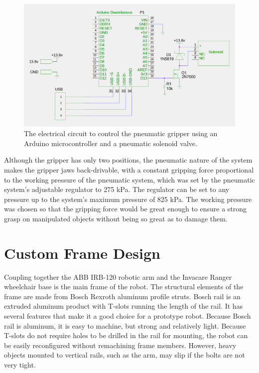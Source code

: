 \documentclass[]{cwru} %
\begin{document}
\begin{figure}[h]
\centering
\includegraphics[width=6.0in]{gripper}
\caption{The electrical circuit to control the pneumatic gripper using 
an Arduino microcontroller and a pneumatic solenoid valve.}
\label{fig:gripper-schematic}
\end{figure}

Although the gripper has only two positions, the pneumatic nature of the
system makes the gripper jaws back-drivable, with a constant gripping
force proportional to the working pressure of the pneumatic system,
which was set by the pneumatic system's adjustable regulator to 275 kPa.
The regulator can be set to any pressure up to the system's maximum
pressure of 825 kPa. The working pressure was chosen so that the
gripping force would be great enough to ensure a strong grasp on
manipulated objects without being so great as to damage
them.

\section{Custom Frame Design}

Coupling together the ABB IRB-120 robotic arm and the Invacare Ranger
wheelchair base is the main frame of the robot. The structural elements
of the frame are made from Bosch Rexroth aluminum profile struts. Bosch
rail is an extruded aluminum product with T-slots running the length of
the rail. It has several features that make it a good choice for a
prototype robot. Because Bosch rail is aluminum, it is easy to machine,
but strong and relatively light. Because T-slots do not require holes to
be drilled in the rail for mounting, the robot can be easily
reconfigured without remachining frame members. However, heavy objects
mounted to vertical rails, such as the arm, may slip if the bolts are
not very tight.
\end{document}
